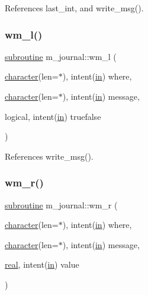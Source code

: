 References last\+\_\+int, and write\+\_\+msg().

\mbox{\label{namespacem__journal_a3229165c77bc7f39fbf88fbcfbdb401e}} 
\subsubsection{\texorpdfstring{wm\+\_\+l()}{wm\_l()}}
{\footnotesize\ttfamily \hyperlink{M__stopwatch_83_8txt_acfbcff50169d691ff02d4a123ed70482}{subroutine} m\+\_\+journal\+::wm\+\_\+l (\begin{DoxyParamCaption}\item[{\hyperlink{option__stopwatch_83_8txt_abd4b21fbbd175834027b5224bfe97e66}{character}(len=$\ast$), intent(\hyperlink{M__journal_83_8txt_afce72651d1eed785a2132bee863b2f38}{in})}]{where,  }\item[{\hyperlink{option__stopwatch_83_8txt_abd4b21fbbd175834027b5224bfe97e66}{character}(len=$\ast$), intent(\hyperlink{M__journal_83_8txt_afce72651d1eed785a2132bee863b2f38}{in})}]{message,  }\item[{logical, intent(\hyperlink{M__journal_83_8txt_afce72651d1eed785a2132bee863b2f38}{in})}]{truefalse }\end{DoxyParamCaption})\hspace{0.3cm}{\ttfamily [private]}}



References write\+\_\+msg().

\mbox{\label{namespacem__journal_ad22893c3621042df7d66b9f3864aa457}} 
\subsubsection{\texorpdfstring{wm\+\_\+r()}{wm\_r()}}
{\footnotesize\ttfamily \hyperlink{M__stopwatch_83_8txt_acfbcff50169d691ff02d4a123ed70482}{subroutine} m\+\_\+journal\+::wm\+\_\+r (\begin{DoxyParamCaption}\item[{\hyperlink{option__stopwatch_83_8txt_abd4b21fbbd175834027b5224bfe97e66}{character}(len=$\ast$), intent(\hyperlink{M__journal_83_8txt_afce72651d1eed785a2132bee863b2f38}{in})}]{where,  }\item[{\hyperlink{option__stopwatch_83_8txt_abd4b21fbbd175834027b5224bfe97e66}{character}(len=$\ast$), intent(\hyperlink{M__journal_83_8txt_afce72651d1eed785a2132bee863b2f38}{in})}]{message,  }\item[{\hyperlink{read__watch_83_8txt_abdb62bde002f38ef75f810d3a905a823}{real}, intent(\hyperlink{M__journal_83_8txt_afce72651d1eed785a2132bee863b2f38}{in})}]{value }\end{DoxyParamCaption})\hspace{0.3cm}{\ttfamily [private]}}



